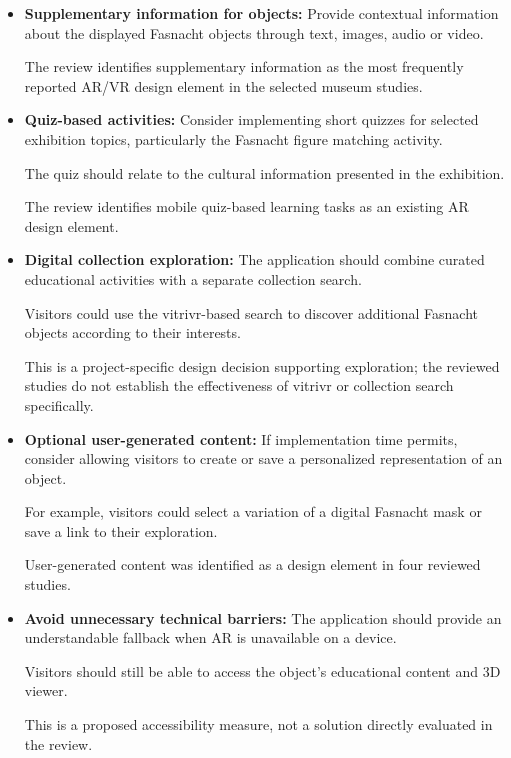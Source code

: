 \begin{itemize}
    This is a proposed implementation inspired
    by the virtual object manipulation category.
    \cite[pp.~6,~9]{zhou_meta-analytic_2022}

    \item \textbf{Supplementary information for objects:}
    Provide contextual information about the
    displayed Fasnacht objects through text,
    images, audio or video.

    The review identifies supplementary information
    as the most frequently reported AR/VR design
    element in the selected museum studies.
    \cite[pp.~6,~9]{zhou_meta-analytic_2022}

    \item \textbf{Quiz-based activities:}
    Consider implementing short quizzes for
    selected exhibition topics, particularly
    the Fasnacht figure matching activity.

    The quiz should relate to the cultural
    information presented in the exhibition.

    The review identifies mobile quiz-based
    learning tasks as an existing AR design element.
    \cite[pp.~6,~9--10]{zhou_meta-analytic_2022}

    \item \textbf{Digital collection exploration:}
    The application should combine curated
    educational activities with a separate
    collection search.

    Visitors could use the vitrivr-based search
    to discover additional Fasnacht objects
    according to their interests.

    This is a project-specific design decision
    supporting exploration; the reviewed studies
    do not establish the effectiveness of
    vitrivr or collection search specifically.
    \cite[pp.~2,~12]{zhou_meta-analytic_2022}

    \item \textbf{Optional user-generated content:}
    If implementation time permits, consider
    allowing visitors to create or save a
    personalized representation of an object.

    For example, visitors could select a
    variation of a digital Fasnacht mask
    or save a link to their exploration.

    User-generated content was identified as
    a design element in four reviewed studies.
    \cite[pp.~6,~9]{zhou_meta-analytic_2022}

    \item \textbf{Avoid unnecessary technical barriers:}
    The application should provide an understandable
    fallback when AR is unavailable on a device.

    Visitors should still be able to access
    the object's educational content and 3D viewer.

    This is a proposed accessibility measure,
    not a solution directly evaluated in the review.
    \cite[pp.~12--13]{zhou_meta-analytic_2022}

\end{itemize}


